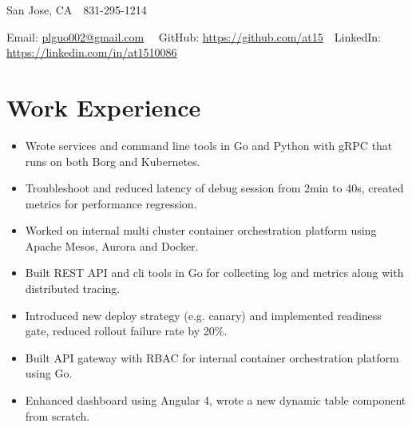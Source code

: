\documentclass[11pt, letterpaper]{simple-cv}
\begin{document}
\centerline{
	San Jose, CA\ \
	831-295-1214\ \
}
\centerline{
	Email: \href{plguo002@gmail.com}{plguo002@gmail.com}\ \
	GitHub: \href{https://github.com/at15}{https://github.com/at15}\ \
	LinkedIn: \href{https://www.linkedin.com/in/at1510086}{https://linkedin.com/in/at1510086}}

\section{Work Experience}

\begin{itemize}
	\item Wrote services and command line tools in Go and Python with gRPC that runs on both Borg and Kubernetes.
	\item Troubleshoot and reduced latency of debug session from 2min to 40s, created metrics for performance regression.
\end{itemize}

\begin{itemize}
	\item Worked on internal multi cluster container orchestration platform using Apache Mesos, Aurora and Docker.
	\item Built REST API and cli tools in Go for collecting log and metrics along with distributed tracing.
	\item Introduced new deploy strategy (e.g. canary) and implemented readiness gate, reduced rollout failure rate by 20\%.
\end{itemize}

\begin{itemize}
	\item Built API gateway with RBAC for internal container orchestration platform using Go.
	\item Enhanced dashboard using Angular 4, wrote a new dynamic table component from scratch.
\end{itemize}
\end{document}

